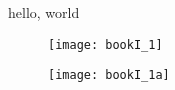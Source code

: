 \documentclass{heath}
\begin{document}
hello, world


\begin{figure}
\texttt{[image: bookI\_1]}
\end{figure}

\begin{figure}
\texttt{[image: bookI\_1a]}
\end{figure}
\end{document}
